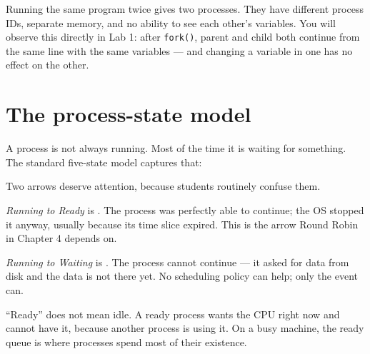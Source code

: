 Running the same program twice gives two processes. They have different process IDs, separate memory, and no ability to see each other's variables. You will observe this directly in Lab 1: after \texttt{fork()}, parent and child both continue from the same line with the same variables --- and changing a variable in one has no effect on the other.

\section*{The process-state model}
A process is not always running. Most of the time it is waiting for something. The standard five-state model captures that:

\begin{mlfigure}
\end{mlfigure}

Two arrows deserve attention, because students routinely confuse them.

\emph{Running to Ready} is . The process was perfectly able to continue; the OS stopped it anyway, usually because its time slice expired. This is the arrow Round Robin in Chapter 4 depends on.

\emph{Running to Waiting} is . The process cannot continue --- it asked for data from disk and the data is not there yet. No scheduling policy can help; only the event can.

\begin{pitfall}
``Ready'' does not mean idle. A ready process wants the CPU right now and cannot have it, because another process is using it. On a busy machine, the ready queue is where processes spend most of their existence.
\end{pitfall}

